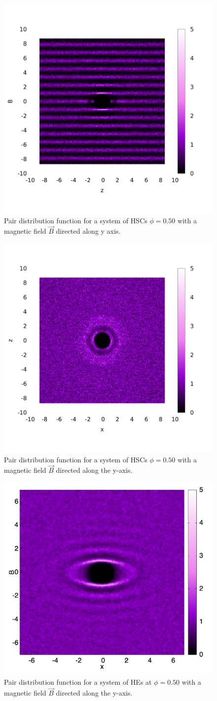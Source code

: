 \documentclass[aip,graphicx]{revtex4-1} %
\begin{document}
\begin{figure}
    \begin{center}
    \includegraphics[width=0.5\columnwidth]{gyz_B.png}
    \caption{Pair distribution function for a system of HSCs $\phi = 0.50$ with a magnetic field $\vec{B}$ directed along y axis.}\label{fig:gyz_B}
    \end{center}
\end{figure}


\begin{figure}
    \centering
    \includegraphics[width=0.5\columnwidth]{gxz_B.png}
    \caption{Pair distribution function for a system of HSCs $\phi = 0.50$ with a magnetic field $\vec{B}$ directed along the y-axis.}\label{fig:gxz_B}
\end{figure}

\begin{figure}
    \begin{center}
    \includegraphics[width=0.4\columnwidth]{gyz_B_HE.png}
    \caption{Pair distribution function for a system of HEs at $\phi = 0.50$ with a magnetic field $\vec{B}$ directed along the y-axis.}\label{fig:gyz_B_HE}
    \end{center}
\end{figure}
\end{document}
